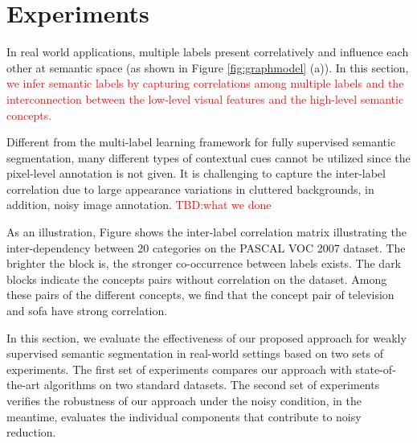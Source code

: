 \section{Experiments}
\if
In real world applications, multiple labels present correlatively and influence each other at semantic space (as shown in Figure \ref{fig:graphmodel} (a)). In this section, {\textcolor{red}{we infer semantic labels by capturing correlations among multiple labels and the interconnection between the low-level visual features and the high-level semantic concepts.}}

Different from the multi-label learning framework for fully supervised semantic segmentation, many different types of contextual cues cannot be utilized since the pixel-level annotation is not given. It is challenging to capture the inter-label correlation due to large appearance variations in cluttered backgrounds, in addition, noisy image annotation. {\textcolor{red}{TBD:what we done}}

As an illustration, Figure shows the inter-label correlation matrix illustrating the inter-dependency between 20 categories on the PASCAL VOC 2007 dataset. The brighter the block is, the stronger co-occurrence between labels exists. The dark blocks indicate the concepts pairs without correlation on the dataset.
Among these pairs of the different concepts, we find that the concept pair of television and sofa have strong correlation.
\fi

In this section, we evaluate the effectiveness of our proposed approach for weakly supervised semantic segmentation in real-world settings based on two sets of experiments. The first set of experiments compares our approach with state-of-the-art algorithms on two standard datasets. The second set of experiments verifies the robustness of our approach under the noisy condition, in the meantime, evaluates the individual components that contribute to noisy reduction.

